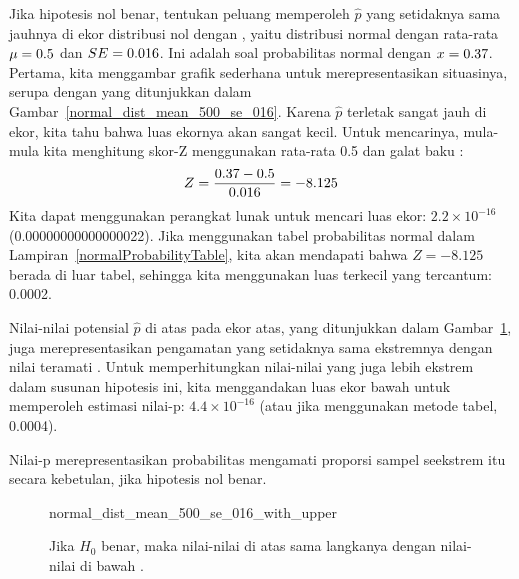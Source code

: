 \begin{examplewrap}
\begin{nexample}{Jika hipotesis nol benar,
    tentukan peluang memperoleh $\hat{p}$ yang setidaknya
    sama jauhnya di ekor distribusi nol dengan \pewcoalpollprop{},
    yaitu distribusi normal dengan rata-rata
    $\mu = 0.5{}$
    dan $SE = 0.016{}$.}
%
  Ini adalah soal probabilitas normal dengan
  $x = 0.37{}$.
  Pertama, kita menggambar grafik sederhana untuk merepresentasikan situasinya,
  serupa dengan yang ditunjukkan dalam
  Gambar~\ref{normal_dist_mean_500_se_016}.
  Karena $\hat{p}$ terletak sangat jauh di ekor, kita tahu bahwa
  luas ekornya akan sangat kecil. Untuk mencarinya, mula-mula
  kita menghitung skor-Z menggunakan rata-rata 0.5 dan
  galat baku \pewcoalpollnullse{}:
  \begin{align*}
  Z = \frac{0.37{} - 0.5}{0.016{}} = -8.125 
  \end{align*}
  Kita dapat menggunakan perangkat lunak untuk mencari luas ekor:
  $2.2 \times 10^{-16}$
  (0.00000000000000022).
  Jika menggunakan tabel probabilitas normal dalam
  Lampiran~\ref{normalProbabilityTable},
  kita akan mendapati bahwa $Z = -8.125$ berada di luar tabel,
  sehingga kita menggunakan luas terkecil yang tercantum: 0.0002.

  Nilai-nilai potensial $\hat{p}$ di atas
  \pewcoalpollpropcomplement{} pada ekor atas, yang ditunjukkan
  dalam Gambar~\ref{normal_dist_mean_500_se_016_with_upper},
  juga merepresentasikan pengamatan yang setidaknya sama ekstremnya dengan
  nilai teramati \pewcoalpollprop{}.
  Untuk memperhitungkan nilai-nilai yang juga lebih
  ekstrem dalam susunan hipotesis ini,
  kita menggandakan luas ekor bawah untuk memperoleh estimasi
  nilai-p: $4.4 \times 10^{-16}$
  (atau jika menggunakan metode tabel, 0.0004).

  Nilai-p merepresentasikan probabilitas mengamati
  proporsi sampel seekstrem itu secara kebetulan, jika hipotesis nol
  benar.
\end{nexample}
\end{examplewrap}

\begin{figure}[h]
  \centering
      {normal_dist_mean_500_se_016_with_upper}
  \caption{
      Jika $H_0$ benar, maka nilai-nilai di atas
      \pewcoalpollpropcomplement{} sama
      langkanya dengan nilai-nilai di bawah \pewcoalpollprop{}.}
  \label{normal_dist_mean_500_se_016_with_upper}
\end{figure}




